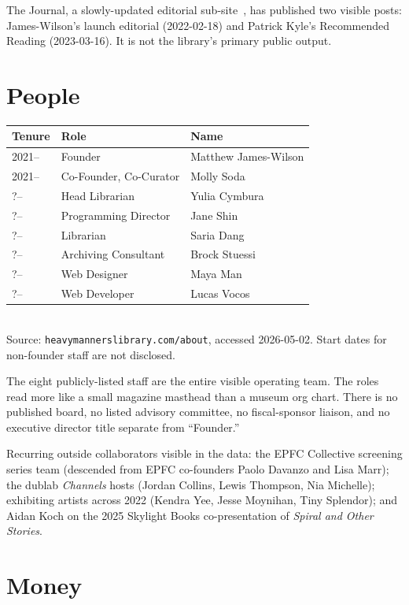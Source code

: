 \documentclass[10pt,letterpaper,twocolumn]{article}
\begin{document}
The Journal, a slowly-updated editorial sub-site~\citep{hmljournal}, has published two visible posts: James-Wilson's launch editorial (2022-02-18) and Patrick Kyle's Recommended Reading (2023-03-16). It is not the library's primary public output.

\section{People}

\begin{table}[h]
\footnotesize
\centering
\setlength{\tabcolsep}{3pt}
\begin{tabularx}{\columnwidth}{lXX}
\toprule
\textbf{Tenure} & \textbf{Role} & \textbf{Name} \\
\midrule
2021-- & Founder & Matthew James-Wilson \\
2021-- & Co-Founder, Co-Curator & Molly Soda \\
?-- & Head Librarian & Yulia Cymbura \\
?-- & Programming Director & Jane Shin \\
?-- & Librarian & Saria Dang \\
?-- & Archiving Consultant & Brock Stuessi \\
?-- & Web Designer & Maya Man \\
?-- & Web Developer & Lucas Vocos \\
\bottomrule
\end{tabularx}
\\[0.3em]
\footnotesize Source: \texttt{heavymannerslibrary.com/about}, accessed 2026-05-02. Start dates for non-founder staff are not disclosed.
\end{table}

The eight publicly-listed staff are the entire visible operating team. The roles read more like a small magazine masthead than a museum org chart. There is no published board, no listed advisory committee, no fiscal-sponsor liaison, and no executive director title separate from ``Founder.''

Recurring outside collaborators visible in the data: the EPFC Collective screening series team (descended from EPFC co-founders Paolo Davanzo and Lisa Marr); the dublab \emph{Channels} hosts (Jordan Collins, Lewis Thompson, Nia Michelle); exhibiting artists across 2022 (Kendra Yee, Jesse Moynihan, Tiny Splendor); and Aidan Koch on the 2025 Skylight Books co-presentation of \emph{Spiral and Other Stories}.

\section{Money}
\end{document}
